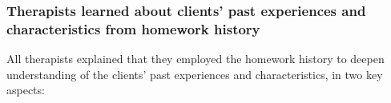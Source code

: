 
\subsubsection{\textbf{Therapists learned about clients' past experiences and characteristics from homework history}}
All therapists explained that they employed the homework history to deepen understanding of the clients' past experiences and characteristics, in two key aspects:

